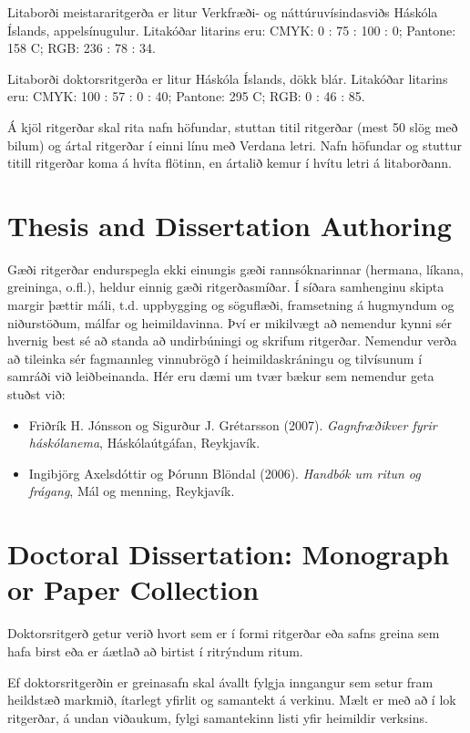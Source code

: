 \documentclass[a4paper,12pt,twoside,BCOR=10mm]{scrbook}
\begin{document}
Litaborði meistararitgerða er litur Verkfræði- og náttúruvísindasviðs Háskóla Íslands, appelsínugulur. Litakóðar litarins eru: CMYK:  0 : 75 : 100 : 0; Pantone: 158 C; RGB: 236 : 78 : 34.

Litaborði doktorsritgerða er litur Háskóla Íslands, dökk blár. Litakóðar litarins eru: CMYK: 100 : 57 : 0 : 40; Pantone: 295 C; RGB: 0 : 46 : 85.

Á kjöl ritgerðar skal rita nafn höfundar, stuttan titil ritgerðar (mest 50 slög með bilum) og ártal ritgerðar í einni línu með Verdana letri. Nafn höfundar og stuttur titill ritgerðar koma á hvíta flötinn, en ártalið kemur í hvítu letri á litaborðann.

\section{Thesis and Dissertation Authoring}
Gæði ritgerðar endurspegla ekki einungis gæði rannsóknarinnar (hermana, líkana, greininga, o.fl.), heldur einnig gæði ritgerðasmíðar. Í síðara samhenginu skipta margir þættir máli, t.d. uppbygging og söguflæði, framsetning á hugmyndum og niðurstöðum, málfar og heimildavinna. Því er mikilvægt að nemendur kynni sér hvernig best sé að standa að undirbúningi og skrifum ritgerðar. Nemendur verða að tileinka sér fagmannleg vinnubrögð í heimildaskráningu og tilvísunum í samráði við leiðbeinanda. Hér eru dæmi um tvær bækur sem nemendur geta stuðst við:
\begin{itemize}
 \item Friðrík H. Jónsson og Sigurður J. Grétarsson (2007). \textit{Gagnfræðikver fyrir háskólanema}, Háskólaútgáfan, Reykjavík.
 \item Ingibjörg Axelsdóttir og Þórunn Blöndal (2006).  \textit{Handbók um ritun og frágang},  Mál og menning, Reykjavík.
\end{itemize}

\section{Doctoral Dissertation: Monograph or Paper Collection}
Doktorsritgerð getur verið hvort sem er í formi ritgerðar eða safns greina sem hafa birst eða  er áætlað að birtist í ritrýndum ritum. 

Ef doktorsritgerðin er greinasafn skal ávallt fylgja inngangur sem setur fram heildstæð markmið, ítarlegt yfirlit og samantekt á verkinu. Mælt er með að í lok ritgerðar, á undan viðaukum, fylgi samantekinn listi yfir heimildir verksins.
\end{document}
